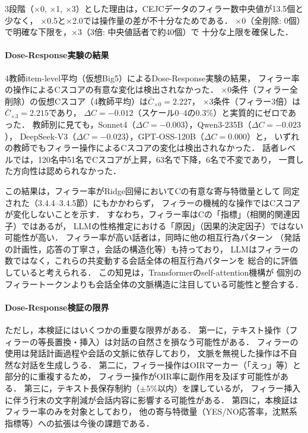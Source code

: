 \documentclass[dvipdfmx,11pt,a4paper]{bxjsarticle}
\renewcommand{\_}{\paperorigunderscore\allowbreak}%
\begin{document}
3段階（×0, ×1, ×3）とした理由は，CEJCデータのフィラー数中央値が13.5個と少なく，
×0.5と×2.0では操作量の差が不十分なためである．
×0（全削除: 0個）で明確な下限を，×3（3倍: 中央値話者で約40個）で
十分な上限を確保した．

\paragraph{Dose-Response実験の結果}

4教師item-level平均（仮想Big5）によるDose-Response実験の結果，
フィラー率の操作によるCスコアの有意な変化は検出されなかった．
×0条件（フィラー全削除）の仮想Cスコア（4教師平均）は$\bar{C}_{{\times 0}} = 2.227$，
×3条件（フィラー3倍）は$\bar{C}_{{\times 3}} = 2.215$であり，
$\Delta C = -0.012$（スケール0--4の0.3\%）と実質的にゼロであった．
教師別に見ても，Sonnet4（$\Delta C = -0.003$），Qwen3-235B（$\Delta C = -0.023$），
DeepSeek-V3（$\Delta C = -0.023$），GPT-OSS-120B（$\Delta C = 0.000$）と，
いずれの教師でもフィラー操作によるCスコアの変化は検出されなかった．
話者レベルでは，120名中51名でCスコアが上昇，63名で下降，6名で不変であり，
一貫した方向性は認められなかった．

この結果は，フィラー率がRidge回帰においてCの有意な寄与特徴量として
同定された（3.4.4--3.4.5節）にもかかわらず，
フィラーの機械的な操作ではCスコアが変化しないことを示す．
すなわち，フィラー率はCの「指標」（相関的関連因子）ではあるが，
LLMの性格推定における「原因」（因果的決定因子）ではない可能性が高い．
フィラー率が高い話者は，同時に他の相互行為パターン
（発話の計画性，応答の丁寧さ，会話の構造化等）も持っており，
LLMはフィラーの数ではなく，これらの共変動する会話全体の相互行為パターンを
総合的に評価していると考えられる．
この知見は，Transformerのself-attention機構が
個別のフィラートークンよりも会話全体の文脈構造に注目している可能性と整合する．

\paragraph{Dose-Response検証の限界}
ただし，本検証にはいくつかの重要な限界がある．
第一に，テキスト操作（フィラーの等長置換・挿入）は対話の自然さを損なう可能性がある．
フィラーの使用は発話計画過程や会話の文脈に依存しており\cite{clark1996,watanabe2003}，
文脈を無視した操作は不自然な対話を生成しうる．
第二に，フィラー操作はOIRマーカー（「えっ」等）と部分的に重複するため，
フィラー操作がOIR率に副作用を及ぼす可能性がある．
第三に，テキスト長保存制約（$\pm 5\%$以内）を課しているが，
フィラー挿入に伴う行末の文字削減が会話内容に影響する可能性がある．
第四に，本検証はフィラー率のみを対象としており，
他の寄与特徴量（YES/NO応答率，沈黙系指標等）への拡張は今後の課題である．
\end{document}
